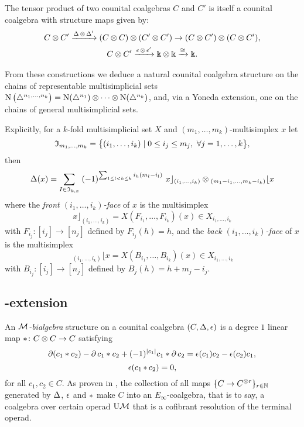 The tensor product of two counital coalgebras $C$ and $C'$ is itself a counital coalgebra with structure maps given by:
\begin{gather*}
	C \ot C^\prime \xra{\copr \ot \copr^\prime}
	(C \ot C) \ot (C^\prime \ot C^\prime) \to
	(C \ot C^\prime) \ot (C \ot C^\prime), \\
	C \ot C^\prime \xra{\aug \ot \aug^\prime}
	\k \ot \k \xra{\cong} \k.
\end{gather*}

From these constructions we deduce a natural counital coalgebra structure on the chains of representable multisimplicial sets $\chains \big( \simplex^{n_1, \dots, n_k} \big) = \chains(\simplex^{n_1}) \ot \dotsb \ot \chains(\simplex^{n_k})$, and, via a Yoneda extension, one on the chains of general multisimplicial sets.

Explicitly, for a $k$-fold multisimplicial set $X$ and $(m_1,\dots,m_k)$-multisimplex $x$ let
\[
\fI_{m_1,\dots,m_k} = \set[\big]{(i_{1},\dots,i_{k}) \mid 0 \le i_j \le m_j,\ \forall j = 1,\dots,k},
\]
then
\[
\copr(x) =
\sum_{I\in \mathfrak{I}_{k,x}} \;
(-1)^{\sum_{1 \leq l<h \leq k} i_h (m_l-i_l) } \
x \rfloor_{(i_{1},\dots,i_{k})} \ot
\!\,_{(m_{1}-i_{1}, \dots, m_{k}-i_{k})} \lfloor x
\]
where the \textit{front $(i_1,\dots,i_k)$-face} of $x$ is the multisimplex
\[
x \rfloor_{(i_{1}, \dots, i_{k})} =
X(F_{i_1}, \dots, F_{i_k})(x) \in X_{i_1,\dots,i_k}
\]
with
$F_{i_j} \colon [i_j] \to [n_j]$ defined by $F_{i_j}(h)=h$, and the \textit{back $(i_1,\dots,i_k)$-face} of $x$ is the multisimplex
\[
\,_{(i_{1}, \dots, i_{k})} \lfloor x =
X(B_{i_1}, \dots, B_{i_k})(x) \in X_{i_1,\dots,i_k}
\]
with $B_{i_j} \colon [i_j] \to [n_j]$ defined by $B_j(h) = h+m_j-i_j$.

\subsection{\pdfEinfty-extension}\label{ss:e-infty extension}

An \textit{$\cM$-bialgebra} structure on a counital coalgebra $(C, \copr, \aug)$ is a degree $1$ linear map $\pr \colon C \ot C \to C$ satisfying
\[
\bd (c_1 \ast c_2) - \bd c_1 \ast c_2 + (-1)^{\bars{c_1}} c_1 \ast \bd c_2 =
\aug(c_1) c_2 - \aug(c_2) c_1,
\]
\[
\aug (c_1 \pr c_2) = 0,
\]
for all $c_1, c_2 \in C$.
As proven in \cite{medina2020prop1}, the collection of all maps $\set{C \to C^{\ot r}}_{r \in \N}$ generated by $\copr$, $\aug$ and $\pr$ make $C$ into an $E_\infty$-coalgebra, that is to say, a coalgebra over certain operad $\UM$ that is a cofibrant resolution of the terminal operad.

